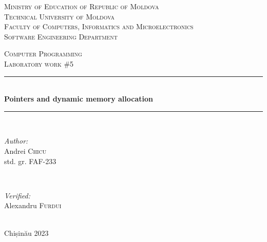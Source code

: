\documentclass[12pt]{article}
\begin{document}
\begin{titlepage}
   \begin{center}
    \textsc{\large Ministry of Education of Republic of Moldova}\\[0.5cm]
    \textsc{\large Technical University of Moldova}\\[0.5cm]
    \textsc{\large Faculty of Computers, Informatics and Microelectronics}\\[0.5cm]
    \textsc{\large Software Engineering Department}\\[1.2cm]
    
    \vspace{25 mm}
    
    \textsc{\Large Computer Programming}\\[0.5cm]
    \textsc{\large Laboratory work \#5}\\[0.5cm]    %
    
    \newcommand{\HRule}{\rule{\linewidth}{0.5mm}}
    \vspace{10 mm}
    \HRule \\[0.4cm]
    { \LARGE \bfseries Pointers and dynamic memory allocation }\\[0.4cm] %
    \HRule \\[1.5cm]
    
    \vspace{10mm}
    
    \begin{minipage}[t]{0.4\textwidth}
    \begin{flushleft} \large
    \emph{Author:} \\
    Andrei \textsc{Chicu}\\                         %
    std. gr. FAF-233                                %
    \end{flushleft}
    \end{minipage}
    ~
    \begin{minipage}[t]{0.4\textwidth}
    \begin{flushright} \large
    \emph{Verified:} \\
    Alexandru \textsc{Furdui}\\
    \end{flushright}
    \end{minipage}\\[3cm]
    
    \vspace{5 mm}
    \large Chișinău 2023\\[0.5cm]
    
    \vfill
    \end{center}
\end{titlepage}
\end{document}
